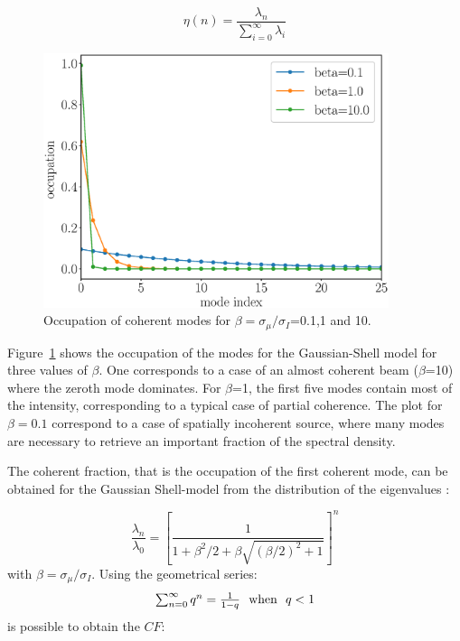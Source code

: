 \documentclass{iucr}              %
\begin{document}
\begin{equation}
\eta(n) = \frac{\lambda_n}{\sum_{i=0}^{\infty} \lambda_i}
\end{equation}

\begin{figure}
  \centering
  \includegraphics[width=0.90\textwidth]{FIGURES/spectrum_gaussianshell.eps} 
  \caption{Occupation of coherent modes for $\beta=\sigma_{\mu}/\sigma_I$=0.1,1 and 10.}
  \label{fig:spectrum_gaussianshell}
\end{figure}

Figure~\ref{fig:spectrum_gaussianshell} shows the occupation of the modes for the Gaussian-Shell model for three values of $\beta$. One corresponds to a case of an almost coherent beam ($\beta$=10) where the zeroth mode dominates. For $\beta$=1, the first five modes contain most of the intensity, corresponding to a typical case of partial coherence. The plot for $\beta=0.1$ correspond to a case of spatially incoherent source, where many modes are necessary to retrieve an important fraction of the spectral density.   

The coherent fraction, that is the occupation of the first coherent mode, can be obtained for the Gaussian Shell-model from the distribution of the eigenvalues \cite{Starikov82}: 

\begin{equation}
\frac{\lambda_n}{\lambda_0} = \left[ \frac{1}{1 + \beta^2/2 + \beta\sqrt{(\beta/2)^2+1}} \right]^n
\label{eigendistribution}
\end{equation}
with $\beta=\sigma_{\mu}/\sigma_I$. Using the geometrical series: 
\begin{equation}
\sum_{n=0}^{\infty} q^n = \frac{1}{1-q}~~\textnormal{when}~~q<1
\end{equation}
is possible to obtain the $CF$:
\end{document}
